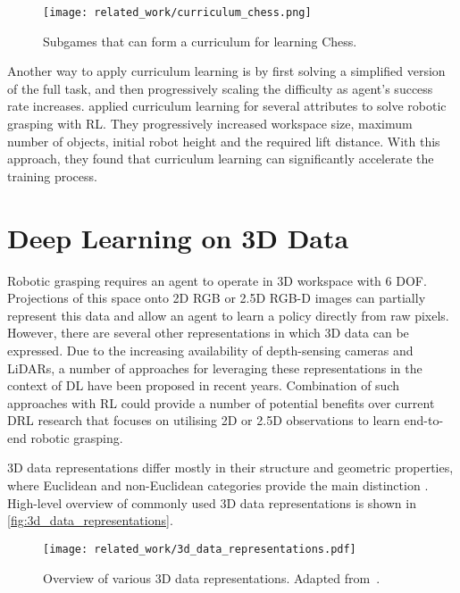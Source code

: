 \begin{figure}[ht]
    \centering
    \texttt{[image: related\_work/curriculum\_chess.png]}
    \caption{Subgames that can form a curriculum for learning Chess.~\protect\cite{narvekar_curriculum_2020}}
    \label{fig:curriculum_chess}
\end{figure}

Another way to apply curriculum learning is by first solving a simplified version of the full task, and then progressively scaling the difficulty as agent's success rate increases. \citet{breyer_comparing_2019} applied curriculum learning for several attributes to solve robotic grasping with RL. They progressively increased workspace size, maximum number of objects, initial robot height and the required lift distance. With this approach, they found that curriculum learning can significantly accelerate the training process.


\section{Deep Learning on 3D Data}

Robotic grasping requires an agent to operate in 3D workspace with 6 DOF. Projections of this space onto 2D RGB or 2.5D RGB-D images can partially represent this data and allow an agent to learn a policy directly from raw pixels. However, there are several other representations in which 3D data can be expressed. Due to the increasing availability of depth-sensing cameras and LiDARs, a number of approaches for leveraging these representations in the context of DL have been proposed in recent years. Combination of such approaches with RL could provide a number of potential benefits over current DRL research that focuses on utilising 2D or 2.5D observations to learn end-to-end robotic grasping.

3D data representations differ mostly in their structure and geometric properties, where Euclidean and non-Euclidean categories provide the main distinction \cite{ahmed_deep_2018}. High-level overview of commonly used 3D data representations is shown in \autoref{fig:3d_data_representations}.

\begin{figure}[ht]
    \centering
    \texttt{[image: related\_work/3d\_data\_representations.pdf]}
    \caption{Overview of various 3D data representations. Adapted from~\protect\citet{ahmed_deep_2018}.}
    \label{fig:3d_data_representations}
\end{figure}


